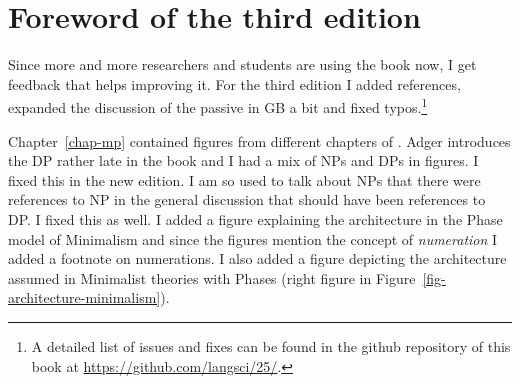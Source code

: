 
\section*{Foreword of the third edition}











Since more and more researchers and students are using the book now, I get feedback that helps
improving it. For the third edition I added references, expanded the discussion of the passive in GB
a bit and fixed typos.\footnote{%
  A detailed list of issues and fixes can be found in the github repository of this book at
  \url{https://github.com/langsci/25/}.%
}

Chapter~\ref{chap-mp} contained figures from different chapters of . Adger
introduces the DP rather late in the book and I had a mix of NPs and DPs in figures. I fixed this in
the new edition. I am so used to talk about NPs that there were references to NP in the general
discussion that should have been references to DP. I fixed this as well. I added a figure explaining
the architecture in the Phase model of Minimalism and since the figures mention the concept of
\emph{numeration} I added a footnote on numerations. I also added a figure depicting the
architecture assumed in Minimalist theories with Phases (right figure in Figure~\ref{fig-architecture-minimalism}).

